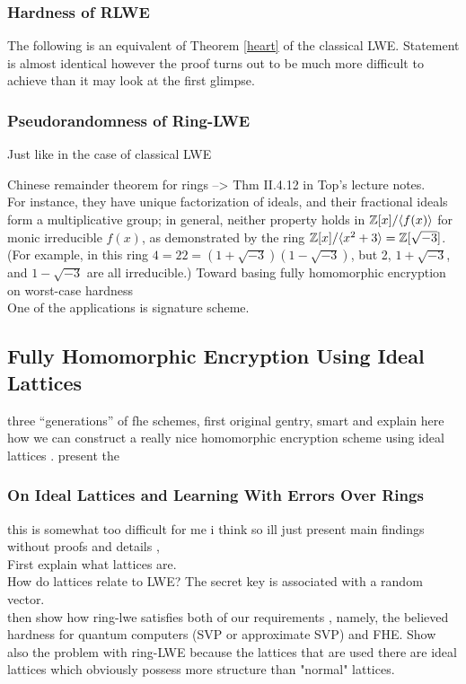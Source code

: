 \subsubsection{Hardness of RLWE}
The following is an equivalent of Theorem \ref{heart} of the classical LWE. Statement is almost identical however the proof turns out to be much more difficult to achieve than it may look at the first glimpse.
\begin{theorem}
\end{theorem}

\subsubsection{Pseudorandomness of Ring-LWE}
Just like in the case of classical LWE

Chinese remainder theorem for rings --> Thm II.4.12 in Top's lecture notes. \\
For instance, they have unique factorization of ideals, and their fractional ideals form a multiplicative group; in general, neither property holds in $\mathbb{Z}[x]/\langle f (x) \rangle$ for monic irreducible $f (x)$, as demonstrated by the ring $\mathbb{Z}[x]/\langle x^2+3 \rangle = \mathbb{Z}[\sqrt{-3}]$. (For example, in this ring $4 = 22 = (1+\sqrt{-3})(1 - \sqrt{-3})$, but 2, $1 + \sqrt{-3}$, and $1 - \sqrt{-3}$ are all irreducible.)
Toward basing fully homomorphic encryption on worst-case hardness \\
One of the applications is \cite{qTESLA} signature scheme.

\subsection{Fully Homomorphic Encryption Using Ideal Lattices}
three ``generations'' of fhe schemes, first original gentry, smart and
explain here how we can construct a really nice homomorphic encryption scheme using ideal lattices \cite{gentry}. present the 
\subsubsection*{On Ideal Lattices and Learning With Errors Over Rings}
this is somewhat too difficult for me i think so ill just present main findings without proofs and details \cite{regev}, \\
First explain what lattices are. \\
How do lattices relate to LWE? The secret key is associated with a random vector. \\
then show how ring-lwe satisfies both of our requirements \cite{ring-lwe}, namely, the believed hardness for quantum computers (SVP or approximate SVP) and FHE. Show also the problem with ring-LWE because the lattices that are used there are ideal lattices which obviously possess more structure than "normal" lattices.
